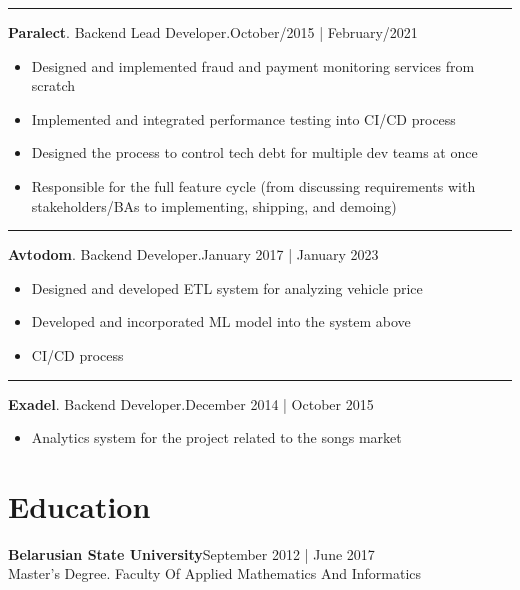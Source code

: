\documentclass{article}
\begin{document}
\par\noindent\rule{\textwidth}{0.4pt}
\textbf{Paralect}. Backend Lead Developer.\hspace*{0pt}\hfill October/2015 | February/2021
\begin{itemize}
    \item Designed and implemented fraud and payment monitoring services from scratch
    \item Implemented and integrated performance testing into CI/CD process
    \item Designed the process to control tech debt for multiple dev teams at once
    \item Responsible for the full feature cycle (from discussing requirements with
stakeholders/BAs to implementing, shipping, and demoing)
\end{itemize}
\par\noindent\rule{\textwidth}{0.4pt}
\textbf{Avtodom}. Backend Developer.\hspace*{0pt}\hfill January 2017 | January 2023
\begin{itemize}
    \item Designed and developed ETL system for analyzing vehicle price
    \item Developed and incorporated ML model into the system above
    \item CI/CD process
\end{itemize}
\par\noindent\rule{\textwidth}{0.4pt}
\textbf{Exadel}. Backend Developer.\hspace*{0pt}\hfill December 2014 | October 2015

\begin{itemize}
\item Analytics system for the project related to the songs market
\end{itemize}

\vspace{-1.5em}
\section*{Education}
\textbf{Belarusian State University}\hspace*{0pt}\hfill September 2012 | June 2017 \\
Master's Degree. Faculty Of Applied Mathematics And Informatics
\end{document}
